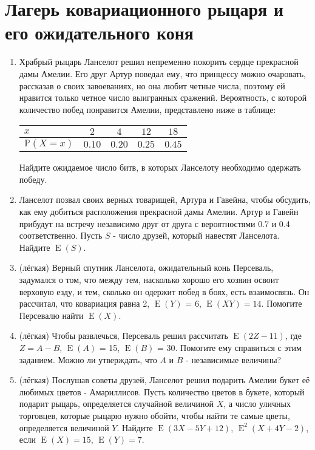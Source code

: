\documentclass[a4paper,12pt]{article}
\DeclareMathOperator{\E}{E}
\def \P{\mathbb{P}}
\begin{document}
\section{Лагерь ковариационного рыцаря и его ожидательного коня}
\begin{enumerate} %
\item Храбрый рыцарь Ланселот решил непременно покорить сердце прекрасной дамы Амелии. Его друг Артур поведал ему, что принцессу можно очаровать, рассказав о своих завоеваниях, но она любит четные числа, поэтому ей нравится только четное число выигранных сражений. Вероятность, с которой количество побед понравится Амелии, представлено ниже в таблице:
\begin{center}\begin{tabular}{lcccc}
\toprule
 $x$     & $2$  & $4$   & $12$ & $18$  \\ \midrule
$\P(X=x)$                 & $0.10$ & $0.20$ & $0.25$ & $0.45$\\
 \bottomrule
\end{tabular}\end{center}
Найдите ожидаемое число битв, в которых Ланселоту необходимо одержать победу.
\item Ланселот позвал своих верных товарищей, Артура и Гавейна, чтобы обсудить, как ему добиться расположения прекрасной дамы Амелии. Артур и Гавейн прибудут на встречу независимо друг от друга с вероятностями 0.7 и 0.4 соответственно. Пусть $S$ - число друзей, который навестят Ланселота. Найдите $\E(S)$.
\item (лёгкая) Верный спутник Ланселота, ожидательный конь Персеваль, задумался о том, что между тем, насколько хорошо его хозяин освоит верховую езду, и тем, сколько он одержит побед в боях, есть взаимосвязь. Он рассчитал, что ковариация равна 2, $\E(Y)$ = 6, $\E(XY) = 14$. Помогите Персевалю найти $\E(X)$.
\item (лёгкая) Чтобы развлечься, Персеваль решил рассчитать $\E(2Z-11)$, где $Z=A-B$, $\E(A)$ = 15, $\E(B)$ = 30. Помогите ему справиться с этим заданием. Можно ли утверждать, что $A$ и $B$ - независимые величины?
\item (лёгкая) Послушав советы друзей, Ланселот решил подарить Амелии букет её любимых цветов - Амариллисов. Пусть количество цветов в букете, который подарит рыцарь, определяется случайной величиной $X$, а число уличных торговцев, которые рыцарю нужно обойти, чтобы найти те самые цветы, определяется величиной $Y$. Найдите $\E(3X-5Y+12)$, $\E^2(X+4Y-2)$, если $\E(X)=15$, $\E(Y)=7$.
\end{enumerate}
\end{document}
